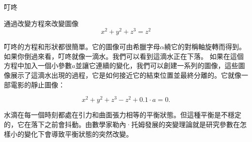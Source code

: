 \begin{surferPage}{叮咚}

通過改變方程來改變圖像\\

\smallskip
\[x^2	+ y^2	+ z^3	= z^2\]

\singlespacing
叮咚的方程和形狀都很簡單。它的圖像可由希臘字母$\alpha$繞它的對稱軸旋轉而得到。如果你倒過來看，叮咚就像一滴水。我們可以看到這滴水正在下落。
\newline
如果在這個方程中加入一個小參數$a$並讓它連續的變化，我們可以創建一系列的圖像，這些圖像展示了這滴水出現的過程，它是如何接近它的結束位置並最終分離的。它就像一部電影的靜止圖像：
\smallskip

\[x^2	+ y^2	+ z^3	-z^2+0.1\cdot a=0.\]

\singlespacing
水滴在每一個時刻都處在引力和曲面張力相等的平衡狀態。但這種平衡是不穩定的，它在落下之前會抖動。由數學家勒內·托姆發展的突變理論就是研究參數在怎樣小的變化下會導致平衡狀態的突然改變。
\end{surferPage}
